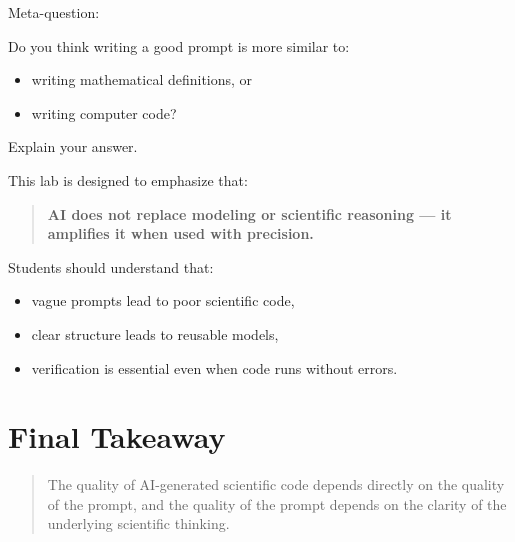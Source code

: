 \documentclass[paper=letter, fontsize=12pt]{article}
\numberwithin{equation}{section}
\begin{document}
\begin{taskbox}
Meta-question:

Do you think writing a good prompt is more similar to:
\begin{itemize}
\item writing mathematical definitions, or
\item writing computer code?
\end{itemize}

Explain your answer.
\end{taskbox}

\bigskip

This lab is designed to emphasize that:

\begin{quote}
\textbf{AI does not replace modeling or scientific reasoning --- it amplifies it when used with precision.}
\end{quote}

Students should understand that:
\begin{itemize}
\item vague prompts lead to poor scientific code,
\item clear structure leads to reusable models,
\item verification is essential even when code runs without errors.
\end{itemize}

\bigskip

\section*{Final Takeaway}

\begin{quote}
The quality of AI-generated scientific code depends directly on the quality of the prompt, and the quality of the prompt depends on the clarity of the underlying scientific thinking.
\end{quote}




%


\end{document}
